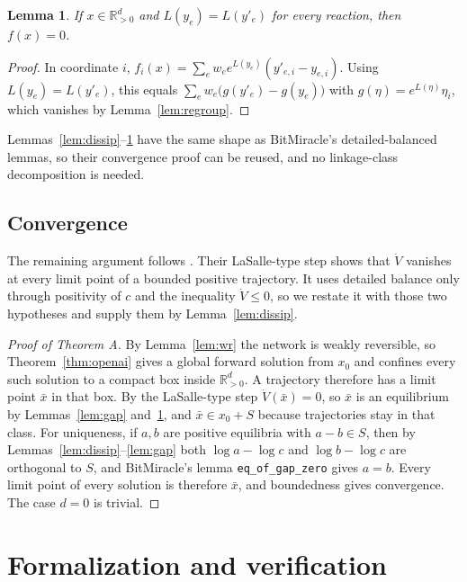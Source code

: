 \documentclass[11pt]{article}
\newcommand{\Rpos}{\mathbb{R}^{d}_{>0}}
\newcommand{\lean}[1]{\texttt{#1}}
\theoremstyle{plain}
\newtheorem{lemma}[theorem]{Lemma}
\theoremstyle{definition}
\theoremstyle{remark}
\begin{document}
\begin{lemma}\label{lem:equil}
If $x \in \Rpos$ and $L(y_e) = L(y'_e)$ for every reaction, then $f(x) = 0$.
\end{lemma}

\begin{proof}
In coordinate $i$, $f_i(x) = \sum_e w_e e^{L(y_e)}(y'_{e,i} - y_{e,i})$. Using $L(y_e) = L(y'_e)$, this equals $\sum_e w_e\bigl(g(y'_e) - g(y_e)\bigr)$ with $g(\eta) = e^{L(\eta)}\eta_i$, which vanishes by Lemma~\ref{lem:regroup}.
\end{proof}

\noindent Lemmas~\ref{lem:dissip}--\ref{lem:equil} have the same shape as BitMiracle's detailed-balanced lemmas, so their convergence proof can be reused, and no linkage-class decomposition is needed.

\subsection{Convergence}

The remaining argument follows \cite{BitMiracle26}. Their LaSalle-type step shows that $\dot V$ vanishes at every limit point of a bounded positive trajectory. It uses detailed balance only through positivity of $c$ and the inequality $\dot V \le 0$, so we restate it with those two hypotheses and supply them by Lemma~\ref{lem:dissip}.

\begin{proof}[Proof of Theorem A]
By Lemma~\ref{lem:wr} the network is weakly reversible, so Theorem~\ref{thm:openai} gives a global forward solution from $x_0$ and confines every such solution to a compact box inside $\Rpos$. A trajectory therefore has a limit point $\bar x$ in that box. By the LaSalle-type step $\dot V(\bar x) = 0$, so $\bar x$ is an equilibrium by Lemmas~\ref{lem:gap} and~\ref{lem:equil}, and $\bar x \in x_0 + S$ because trajectories stay in that class. For uniqueness, if $a, b$ are positive equilibria with $a - b \in S$, then by Lemmas~\ref{lem:dissip}--\ref{lem:gap} both $\log a - \log c$ and $\log b - \log c$ are orthogonal to $S$, and BitMiracle's lemma \lean{eq\_of\_gap\_zero} gives $a = b$. Every limit point of every solution is therefore $\bar x$, and boundedness gives convergence. The case $d = 0$ is trivial.
\end{proof}

\section{Formalization and verification}\label{sec:formal}
\end{document}
